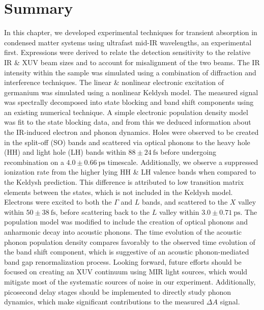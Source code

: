 \section{Summary}


In this chapter, we developed experimental techniques for transient absorption in condensed matter systems using ultrafast mid-IR wavelengths, an experimental first. Expressions were derived to relate the detection sensitivity to the relative IR \& XUV beam sizes and to account for misalignment of the two beams. The IR intensity within the sample was simulated using a combination of diffraction and interference techniques. The linear \& nonlinear electronic excitation of germanium was simulated using a nonlinear Keldysh model. The measured signal was spectrally decomposed into state blocking and band shift components using an existing numerical technique. A simple electronic population density model was fit to the state blocking data, and from this we deduced information about the IR-induced electron and phonon dynamics. Holes were observed to be created in the split-off (SO) bands and scattered via optical phonons to the heavy hole (HH) and light hole (LH) bands within $88 \pm 24 \ \textrm{fs}$ before undergoing recombination on a $4.0 \pm 0.66 \ \textrm{ps}$ timescale. Additionally, we observe a suppressed ionization rate from the higher lying HH \& LH valence bands when compared to the Keldysh prediction. This difference is attributed to low transition matrix elements between the states, which is not included in the Keldysh model. Electrons were excited to both the $\Gamma$ and $L$ bands, and scattered to the $X$ valley within $50 \pm 38 \ \textrm{fs}$, before scattering back to the $L$ valley within $3.0 \pm 0.71 \ \textrm{ps}$. The population model was modified to include the creation of optical phonons and anharmonic decay into acoustic phonons. The time evolution of the acoustic phonon population density compares favorably to the observed time evolution of the band shift component, which is suggestive of an acoustic phonon-mediated band gap renormalization process. Looking forward, future efforts should be focused on creating an XUV continuum using MIR light sources, which would mitigate most of the systematic sources of noise in our experiment. Additionally, picosecond delay stages should be implemented to directly study phonon dynamics, which make significant contributions to the measured $\Delta A$ signal.




